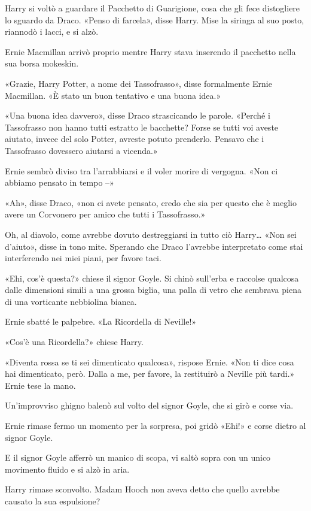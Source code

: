 Harry si voltò a guardare il Pacchetto di Guarigione, cosa che gli fece distogliere lo sguardo da Draco. «Penso di farcela», disse Harry. Mise la siringa al suo posto, riannodò i lacci, e si alzò.

Ernie Macmillan arrivò proprio mentre Harry stava inserendo il pacchetto nella sua borsa mokeskin.

«Grazie, Harry Potter, a nome dei Tassofrasso», disse formalmente Ernie Macmillan. «È stato un buon tentativo e una buona idea.»

«Una buona idea davvero», disse Draco strascicando le parole. «Perché i Tassofrasso non hanno tutti estratto le bacchette? Forse se tutti voi aveste aiutato, invece del solo Potter, avreste potuto prenderlo. Pensavo che i Tassofrasso dovessero aiutarsi a vicenda.»

Ernie sembrò diviso tra l’arrabbiarsi e il voler morire di vergogna. «Non ci abbiamo pensato in tempo –»

«Ah», disse Draco, «non ci avete pensato, credo che sia per questo che è meglio avere un Corvonero per amico che tutti i Tassofrasso.»

Oh, al diavolo, come avrebbe dovuto destreggiarsi in tutto ciò Harry… «Non sei d’aiuto», disse in tono mite. Sperando che Draco l’avrebbe interpretato come stai interferendo nei miei piani, per favore taci.

«Ehi, cos’è questa?» chiese il signor Goyle. Si chinò sull’erba e raccolse qualcosa dalle dimensioni simili a una grossa biglia, una palla di vetro che sembrava piena di una vorticante nebbiolina bianca.

Ernie sbatté le palpebre. «La Ricordella di Neville!»

«Cos’è una Ricordella?» chiese Harry.

«Diventa rossa se ti sei dimenticato qualcosa», rispose Ernie. «Non ti dice cosa hai dimenticato, però. Dalla a me, per favore, la restituirò a Neville più tardi.» Ernie tese la mano.

Un’improvviso ghigno balenò sul volto del signor Goyle, che si girò e corse via.

Ernie rimase fermo un momento per la sorpresa, poi gridò «Ehi!» e corse dietro al signor Goyle.

E il signor Goyle afferrò un manico di scopa, vi saltò sopra con un unico movimento fluido e si alzò in aria.

Harry rimase sconvolto. Madam Hooch non aveva detto che quello avrebbe causato la sua espulsione?

